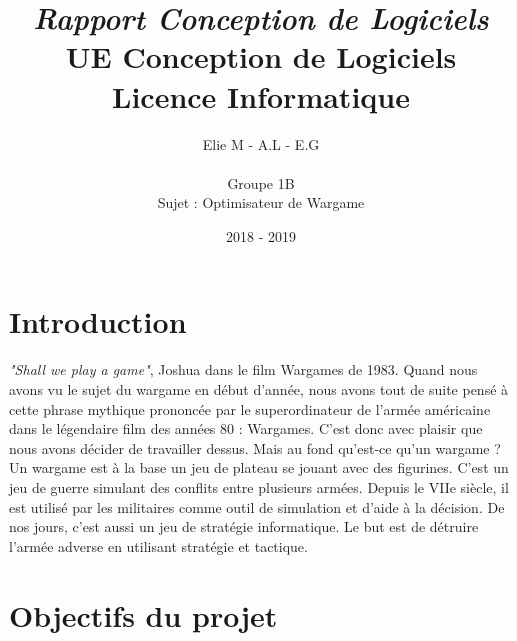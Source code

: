 \documentclass[a4paper]{article} %
\title{
\LARGE{\em{Rapport Conception de Logiciels}}\\\vspace*{0.5cm}
UE Conception de Logiciels\\
Licence Informatique
}
\author{
Elie M - A.L - E.G\\
\small{{ }}\\\vspace*{1cm}
Groupe 1B\\
Sujet : Optimisateur de Wargame
}
\date{2018 - 2019}
\begin{document}
\newpage
\newpage
	\null %
\newpage

\tableofcontents
\newpage

\section{Introduction}
\textit{"Shall we play a game"}, Joshua dans le film Wargames de 1983.
\medbreak
Quand nous avons vu le sujet du wargame en début d'année, nous avons tout de suite pensé à cette phrase mythique prononcée par le superordinateur de l'armée américaine dans le légendaire film des années 80 : Wargames. 
\smallbreak
C'est donc avec plaisir que nous avons décider de travailler dessus.
\smallbreak
Mais au fond qu'est-ce qu'un wargame ? Un wargame est à la base un jeu de plateau se jouant avec des figurines. C'est un jeu de guerre simulant des conflits entre plusieurs armées. Depuis le VIIe siècle, il est utilisé par les militaires comme outil de simulation et d'aide à la décision. De nos jours, c'est aussi un jeu de stratégie informatique. Le but est de détruire l'armée adverse en utilisant stratégie et tactique.

\section{Objectifs du projet}	
\end{document}
